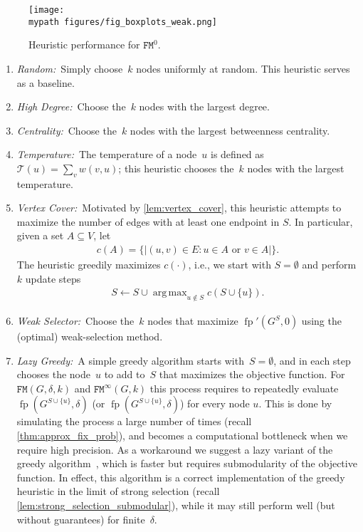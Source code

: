 \documentclass[letterpaper]{article}
\def\mypath{}
\def\dfp{\fp'(G^S,0)}
\DeclareMathOperator*{\argmax}{arg\,max}
\newcommand{\fp}{\operatorname{fp}}
\newcommand{\Temp}{\mathcal{T}}
\newcommand{\NodeActivationMoran}{\texttt{FM}}
\newcommand{\NodeActivationMoranStrong}{\texttt{FM}^{\infty}}
\newcommand{\NodeActivationMoranWeak}{\texttt{FM}^{0}}
\newcommand{\FitAdv}{\delta}
\newcommand{\Weight}{w}
\begin{document}
\begin{figure*}[!ht]
\texttt{[image: \\mypath figures/fig\_boxplots\_weak.png]}
\caption{Heuristic performance for $\NodeActivationMoranWeak$.}\label{fig:experiments_weak}
\end{figure*}



\begin{enumerate}
\item \emph{Random:}~Simply choose~$k$ nodes uniformly at random. This heuristic serves as a baseline.
\item \emph{High Degree:}~Choose the~$k$ nodes with the largest degree.
\item \emph{Centrality:}~Choose the~$k$ nodes with the largest betweenness centrality.
\item \emph{Temperature:}~The temperature of a node~$u$ is defined as $\Temp(u)=\sum_{v} \Weight(v,u)$; this heuristic chooses the~$k$ nodes with the largest temperature.
\item \emph{Vertex Cover:}~Motivated by \cref{lem:vertex_cover}, this heuristic attempts to maximize the number of edges with at least one endpoint in $S$.
In particular, given a set $A\subseteq V$, let
\begin{align}
c(A)=\{ |(u,v)\in E\colon u\in A\text{ or }v\in A|  \}.
\end{align}
The heuristic greedily maximizes $c(\cdot)$, i.e.,
we start with $S=\emptyset$ and perform $k$ update steps
\begin{align}
S\gets S\cup  \argmax_{u\not \in S} c(S\cup\{u\}).
\end{align}
\item \emph{Weak Selector:}~Choose the~$k$ nodes that maximize $\dfp$ using the (optimal) weak-selection method.
\item \emph{Lazy Greedy:}~A simple greedy algorithm starts with~$S=\emptyset$, and in each step chooses the node~$u$ to add to~$S$ that maximizes the objective function.
For $\NodeActivationMoran(G,\FitAdv,k)$ and $\NodeActivationMoranStrong(G,k)$ this process requires to repeatedly evaluate $\fp(G^{S\cup\{u\}},\FitAdv)$ (or $\fp(G^{S\cup\{u\}},\FitAdv)$) for every node $u$.
This is done by simulating the process a large number of times (recall \cref{thm:approx_fix_prob}), and becomes a computational bottleneck when we require high precision. As a workaround we suggest a lazy variant of the greedy algorithm~\cite{Minoux1978}, which is faster but requires submodularity of the objective function. In effect, this algorithm is a correct implementation of the greedy heuristic in the limit of strong selection (recall \cref{lem:strong_selection_submodular}), while it may still perform well (but without guarantees) for finite~$\FitAdv$.
\end{enumerate}
\end{document}
